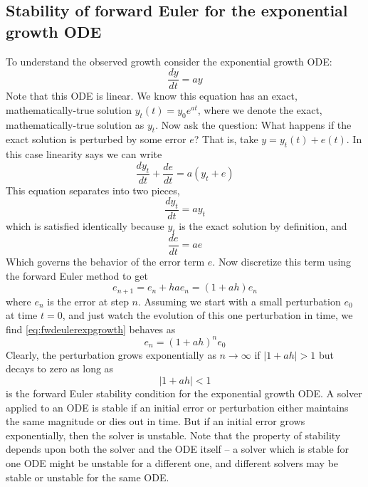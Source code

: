 \documentclass[hidelinks,notitlepage]{book}
\begin{document}
\subsection{Stability of forward Euler for the exponential growth ODE}
To understand the observed growth consider the exponential growth ODE:
\begin{equation}
\label{eq:SimpleLinearODE}
\frac{dy}{dt} = a y
\end{equation}
Note that this ODE is linear.  We know this equation has an exact, mathematically-true solution $y_t(t) = y_0 e^{a t}$, where we denote the exact, mathematically-true solution as $y_t$.  Now ask the question: What happens if the exact solution is perturbed by some error $e$?  That is, take $y = y_t(t) + e(t)$.  In this case linearity says we can write
\begin{equation}
\nonumber
\frac{dy_t}{dt} + \frac{de}{dt} = a (y_t + e)
\end{equation}
This equation separates into two pieces,
\begin{equation}
\nonumber
\frac{dy_t}{dt} = a y_t
\end{equation}
which is satisfied identically because $y_t$ is the exact solution by definition, and 
\begin{equation}
\nonumber
\frac{de}{dt} = a e
\end{equation}
Which governs the behavior of the error term $e$.  Now discretize this term 
using the forward Euler method to get
\begin{equation}
\label{eq:fwdeulerexpgrowth}
e_{n+1} = e_n + h a e_n = (1 + a h)e_n
\end{equation}
where $e_n$ is the error at step $n$.  Assuming we start with a small perturbation $e_0$ at time $t=0$, and just watch the evolution of this one perturbation in time, we find \cref{eq:fwdeulerexpgrowth} behaves as
\begin{equation}
e_{n} = (1 + a h)^n e_0
\end{equation}
Clearly, the perturbation grows exponentially as $n \rightarrow \infty$ if $\lvert 1 + a h \rvert > 1$ but decays to zero as long as
\begin{equation}
\label{eq:ForwardEulerStabilityCond}
\lvert 1 + a h \rvert < 1
\end{equation}
  is the forward Euler stability condition for the exponential growth ODE.
A solver applied to an ODE is stable if an initial error or perturbation either maintains the same magnitude or dies out in time.  But if an initial error grows exponentially, then the solver is unstable.  Note that the property of stability depends upon both the solver and the ODE itself -- a solver which is stable for one ODE might be unstable for a different one, and different solvers may be stable or unstable for the same ODE.  
\end{document}
